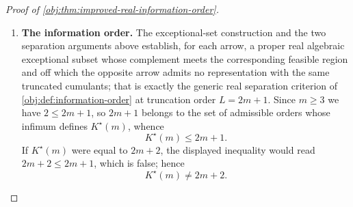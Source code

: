 \begin{proof}[Proof of \cref{obj:thm:improved-real-information-order}]
\begin{enumerate}
\item \textbf{The information order.}  The exceptional-set construction and the two separation arguments above establish, for each arrow, a proper real algebraic exceptional subset whose complement meets the corresponding feasible region and off which the opposite arrow admits no representation with the same truncated cumulants; that is exactly the generic real separation criterion of \cref{obj:def:information-order} at truncation order \(L=2m+1\).  Since \(m\ge3\) we have \(2\le 2m+1\), so \(2m+1\) belongs to the set of admissible orders whose infimum defines \(K^\star(m)\), whence
\[
K^\star(m)\le 2m+1 .
\]
If \(K^\star(m)\) were equal to \(2m+2\), the displayed inequality would read \(2m+2\le 2m+1\), which is false; hence
\[
K^\star(m)\ne 2m+2 .
\]
\end{enumerate}
\end{proof}

